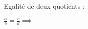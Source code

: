 \documentclass[12pt]{article}
\newcounter{exemple}
\newcommand{\exemple}{%
  \refstepcounter{exemple}%
  \textbf{\textcolor{orange}{Exemple \theexemple : }} \ignorespaces
}
\newcounter{solution}
\newcommand{\solution}{%
  \refstepcounter{solution}%
  \textbf{\textcolor{orange}{Solution \thesolution : }} \ignorespaces
}
\newcounter{exerciceapp}
\newcommand{\exerciceapp}{%
  \refstepcounter{exerciceapp}%
  \textbf{\textcolor{myorange}{Exercice d'application \theexerciceapp :}} \ignorespaces
}
\newcounter{correction}
\newcommand{\correction}{%
  \refstepcounter{correction}%
  \textbf{\textcolor{myorange}{Correction \thecorrection :}} \ignorespaces
}
\newcounter{remarque}
\newcommand{\remarque}{%
  \refstepcounter{remarque}%
  \textbf{\textcolor{myorange1}{Remarque \theremarque :}} \ignorespaces
}
\begin{document}
Egalité de deux quotients :

$\frac{a}{b}=\frac{c}{d} \implies$







\end{document}

